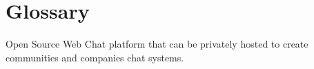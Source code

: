 \section{Glossary}

Open Source Web Chat platform that can be privately hosted to create communities and companies chat systems.
